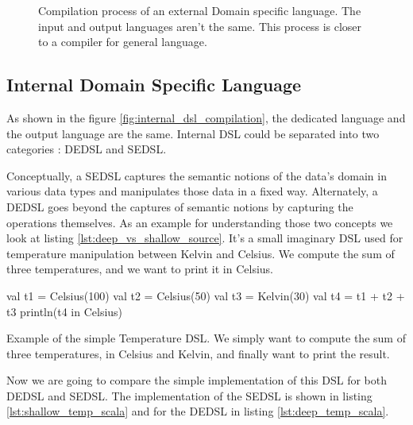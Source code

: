 \begin{figure}[ht]
  \centering
  \caption[Compilation process of an external \gls{DSL}]{Compilation process of
    an external Domain specific language. The input and output languages aren't
    the same. This process is closer to a compiler for general language.}
  \label{fig:external_dsl_compilation}
\end{figure}

\subsection{Internal Domain Specific Language}
\label{sec:internal_dsl}

As shown in the figure \ref{fig:internal_dsl_compilation}, the dedicated language
and the output language are the same. Internal \gls{DSL} could be separated into
two categories : \gls{DEDSL} and \gls{SEDSL}.

Conceptually, a \gls{SEDSL} captures the semantic notions of the data's domain in
various data types and manipulates those data in a fixed way. Alternately, a
\gls{DEDSL} goes beyond the captures of semantic notions by capturing the
operations themselves. As an example for understanding those two concepts we look
at listing \ref{lst:deep_vs_shallow_source}. It's a small imaginary DSL used for
temperature manipulation between Kelvin and Celsius. We compute the sum
of three temperatures, and we want to print it in Celsius.

\begin{listing}[ht]
\centering
\begin{scalacode}
val t1 = Celsius(100)
val t2 = Celsius(50)
val t3 = Kelvin(30)
val t4 = t1 + t2 + t3
println(t4 in Celsius)
\end{scalacode}
\caption[Usage of the simple Temperature \gls{DSL}]{Example of the simple
Temperature \gls{DSL}. We simply want to compute the sum of three temperatures,
in Celsius and Kelvin, and finally want to print the result.}
\label{lst:deep_vs_shallow_source}
\end{listing}

Now we are going to compare the simple implementation of this \gls{DSL} for
both \gls{DEDSL} and \gls{SEDSL}. The implementation of the \gls{SEDSL} is
shown in listing \ref{lst:shallow_temp_scala} and for the \gls{DEDSL} in
listing \ref{lst:deep_temp_scala}.

